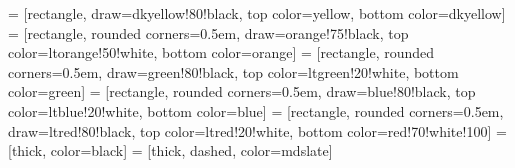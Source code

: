 \usetikzlibrary{arrows,shapes,matrix}

 = [rectangle, 
                      draw=dkyellow!80!black,
                      top color=yellow,
                      bottom color=dkyellow]
 = [rectangle, 
                      rounded corners=0.5em,
                      draw=orange!75!black,
                      top color=ltorange!50!white,
                      bottom color=orange]
 = [rectangle, 
                      rounded corners=0.5em,
                      draw=green!80!black,
                      top color=ltgreen!20!white,
                      bottom color=green]
 = [rectangle, 
                      rounded corners=0.5em,
                      draw=blue!80!black,
                      top color=ltblue!20!white,
                      bottom color=blue]
 = [rectangle, 
                      rounded corners=0.5em,
                      draw=ltred!80!black,
                      top color=ltred!20!white,
                      bottom color=red!70!white!100]
 = [thick, color=black]
 = [thick, dashed, color=mdslate]


